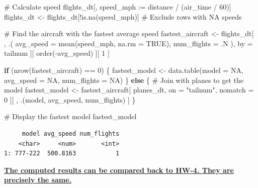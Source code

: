 \documentclass[
  12pt,
]{article}
\newenvironment{Shaded}{\begin{snugshade}}{\end{snugshade}}
\newcommand{\AttributeTok}[1]{\textcolor[rgb]{0.40,0.45,0.13}{#1}}
\newcommand{\CommentTok}[1]{\textcolor[rgb]{0.37,0.37,0.37}{#1}}
\newcommand{\ConstantTok}[1]{\textcolor[rgb]{0.56,0.35,0.01}{#1}}
\newcommand{\ControlFlowTok}[1]{\textcolor[rgb]{0.00,0.23,0.31}{\textbf{#1}}}
\newcommand{\DecValTok}[1]{\textcolor[rgb]{0.68,0.00,0.00}{#1}}
\newcommand{\ErrorTok}[1]{\textcolor[rgb]{0.68,0.00,0.00}{#1}}
\newcommand{\FunctionTok}[1]{\textcolor[rgb]{0.28,0.35,0.67}{#1}}
\newcommand{\NormalTok}[1]{\textcolor[rgb]{0.00,0.23,0.31}{#1}}
\newcommand{\OtherTok}[1]{\textcolor[rgb]{0.00,0.23,0.31}{#1}}
\newcommand{\SpecialCharTok}[1]{\textcolor[rgb]{0.37,0.37,0.37}{#1}}
\newcommand{\StringTok}[1]{\textcolor[rgb]{0.13,0.47,0.30}{#1}}
\begin{document}
\begin{Shaded}
\begin{Highlighting}[]
\CommentTok{\# Calculate speed}
\NormalTok{flights\_dt[, speed\_mph }\SpecialCharTok{:}\ErrorTok{=}\NormalTok{ distance }\SpecialCharTok{/}\NormalTok{ (air\_time }\SpecialCharTok{/} \DecValTok{60}\NormalTok{)]}
\NormalTok{flights\_dt }\OtherTok{\textless{}{-}}\NormalTok{ flights\_dt[}\SpecialCharTok{!}\FunctionTok{is.na}\NormalTok{(speed\_mph)] }\CommentTok{\# Exclude rows with NA speeds}

\CommentTok{\# Find the aircraft with the fastest average speed}
\NormalTok{fastest\_aircraft }\OtherTok{\textless{}{-}}\NormalTok{ flights\_dt[}
\NormalTok{  , .(}
    \AttributeTok{avg\_speed =} \FunctionTok{mean}\NormalTok{(speed\_mph, }\AttributeTok{na.rm =} \ConstantTok{TRUE}\NormalTok{),}
    \AttributeTok{num\_flights =}\NormalTok{ .N}
\NormalTok{  ), by }\OtherTok{=}\NormalTok{ tailnum}
\NormalTok{][}
  \FunctionTok{order}\NormalTok{(}\SpecialCharTok{{-}}\NormalTok{avg\_speed)}
\NormalTok{][}
  \DecValTok{1}
\NormalTok{]}

\ControlFlowTok{if}\NormalTok{ (}\FunctionTok{nrow}\NormalTok{(fastest\_aircraft) }\SpecialCharTok{==} \DecValTok{0}\NormalTok{) \{}
\NormalTok{  fastest\_model }\OtherTok{\textless{}{-}} \FunctionTok{data.table}\NormalTok{(}\AttributeTok{model =} \ConstantTok{NA}\NormalTok{, }\AttributeTok{avg\_speed =} \ConstantTok{NA}\NormalTok{, }\AttributeTok{num\_flights =} \ConstantTok{NA}\NormalTok{)}
\NormalTok{\} }\ControlFlowTok{else}\NormalTok{ \{}
  \CommentTok{\# Join with planes to get the model}
\NormalTok{  fastest\_model }\OtherTok{\textless{}{-}}\NormalTok{ fastest\_aircraft[}
\NormalTok{    planes\_dt, on }\OtherTok{=} \StringTok{"tailnum"}\NormalTok{, nomatch }\OtherTok{=} \DecValTok{0}
\NormalTok{  ][}
\NormalTok{    , .(model, avg\_speed, num\_flights)}
\NormalTok{  ]}
\NormalTok{\}}

\CommentTok{\# Display the fastest model}
\NormalTok{fastest\_model}
\end{Highlighting}
\end{Shaded}

\begin{verbatim}
     model avg_speed num_flights
    <char>     <num>       <int>
1: 777-222  500.8163           1
\end{verbatim}

\ul{\textbf{The computed results can be compared back to HW-4. They are
precisely the same.}}
\end{document}
